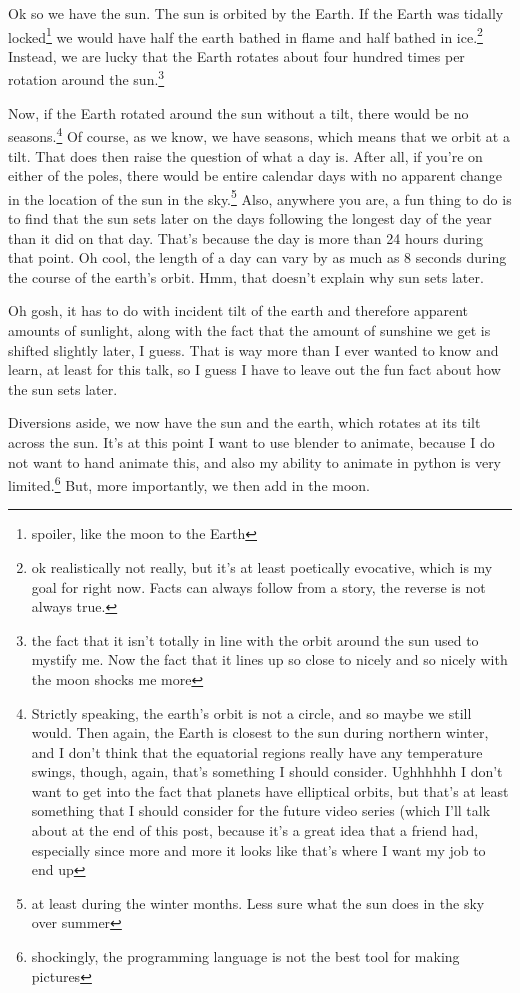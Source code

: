 \documentclass[12pt]{article}[titlepage]
\newcommand{\1}{\={a}}
\newcommand{\2}{\={e}}
\newcommand{\3}{\={\i}}
\newcommand{\4}{\=o}
\newcommand{\5}{\=u}
\newcommand{\6}{\={A}}
\renewcommand{\,}{\textsuperscript{,}}
\begin{document}
Ok so we have the sun.
The sun is orbited by the Earth.
If the Earth was tidally locked\footnote{spoiler, like the moon to the Earth} we would have half the earth bathed in flame and half bathed in ice.\footnote{ok realistically not really, but it's at least poetically evocative, which is my goal for right now. Facts can always follow from a story, the reverse is not always true.}
Instead, we are lucky that the Earth rotates about four hundred times per rotation around the sun.\footnote{the fact that it isn't totally in line with the orbit around the sun used to mystify me. Now the fact that it lines up so close to nicely and so nicely with the moon shocks me more}

Now, if the Earth rotated around the sun without a tilt, there would be no seasons.\footnote{Strictly speaking, the earth's orbit is not a circle, and so maybe we still would. Then again, the Earth is closest to the sun during northern winter, and I don't think that the equatorial regions really have any temperature swings, though, again, that's something I should consider. Ughhhhhh I don't want to get into the fact that planets have elliptical orbits, but that's at least something that I should consider for the future video series (which I'll talk about at the end of this post, because it's a great idea that a friend had, especially since more and more it looks like that's where I want my job to end up}
Of course, as we know, we have seasons, which means that we orbit at a tilt.
That does then raise the question of what a day is.
After all, if you're on either of the poles, there would be entire calendar days with no apparent change in the location of the sun in the sky.\footnote{at least during the winter months.
Less sure what the sun does in the sky over summer}
Also, anywhere you are, a fun thing to do is to find that the sun sets later on the days following the longest day of the year than it did on that day.
That's because the day is more than 24 hours during that point.
Oh cool, the length of a day can vary by as much as 8 seconds during the course of the earth's orbit.
Hmm, that doesn't explain why sun sets later.

Oh gosh, it has to do with incident tilt of the earth and therefore apparent amounts of sunlight, along with the fact that the amount of sunshine we get is shifted slightly later, I guess.
That is way more than I ever wanted to know and learn, at least for this talk, so I guess I have to leave out the fun fact about how the sun sets later.

Diversions aside, we now have the sun and the earth, which rotates at its tilt across the sun.
It's at this point I want to use blender to animate, because I do not want to hand animate this, and also my ability to animate in python is very limited.\footnote{shockingly, the programming language is not the best tool for making pictures}
But, more importantly, we then add in the moon.
\end{document}
